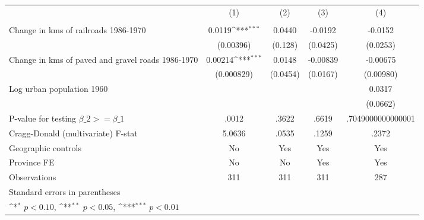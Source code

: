 {
\def\sym#1{\ifmmode^{#1}\else\(^{#1}\)\fi}
\begin{tabular}{l*{4}{c}}
\hline\hline
                &\multicolumn{1}{c}{(1)}&\multicolumn{1}{c}{(2)}&\multicolumn{1}{c}{(3)}&\multicolumn{1}{c}{(4)}\\
                &\multicolumn{1}{c}{}&\multicolumn{1}{c}{}&\multicolumn{1}{c}{}&\multicolumn{1}{c}{}\\
\hline
Change in kms of railroads 1986-1970&   0.0119\sym{***}&   0.0440         &  -0.0192         &  -0.0152         \\
                &(0.00396)         &  (0.128)         & (0.0425)         & (0.0253)         \\
[1em]
Change in kms of paved and gravel roads 1986-1970&  0.00214\sym{***}&   0.0148         & -0.00839         & -0.00675         \\
                &(0.000829)         & (0.0454)         & (0.0167)         &(0.00980)         \\
[1em]
Log urban population 1960&                  &                  &                  &   0.0317         \\
                &                  &                  &                  & (0.0662)         \\
\hline
P-value for testing $\beta\_{2} >= \beta\_{1}$&    .0012         &    .3622         &    .6619         &.7049000000000001         \\
Cragg-Donald (multivariate) F-stat&   5.0636         &    .0535         &    .1259         &    .2372         \\
Geographic controls&       No         &      Yes         &      Yes         &      Yes         \\
Province FE     &       No         &       No         &      Yes         &      Yes         \\
Observations    &      311         &      311         &      311         &      287         \\
\hline\hline
\multicolumn{5}{l}{\footnotesize Standard errors in parentheses}\\
\multicolumn{5}{l}{\footnotesize \sym{*} \(p<0.10\), \sym{**} \(p<0.05\), \sym{***} \(p<0.01\)}\\
\end{tabular}
}
